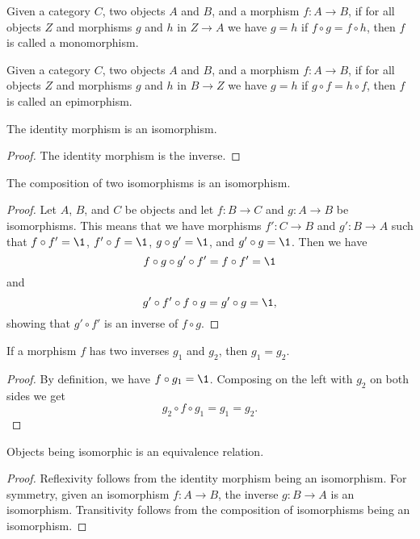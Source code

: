 \documentclass[../../math.tex]{subfiles}
\begin{document}
\begin{definition}
    Given a category $C$, two objects $A$ and $B$, and a morphism $f : A \to B$,
    if for all objects $Z$ and morphisms $g$ and $h$ in $Z \to A$ we have $g =
    h$ if $f \circ g = f \circ h$, then $f$ is called a monomorphism.
\end{definition}

\begin{definition}
    Given a category $C$, two objects $A$ and $B$, and a morphism $f : A \to B$,
    if for all objects $Z$ and morphisms $g$ and $h$ in $B \to Z$ we have $g =
    h$ if $g \circ f = h \circ f$, then $f$ is called an epimorphism.
\end{definition}

\begin{theorem}
    The identity morphism is an isomorphism.
\end{theorem}
\begin{proof}
    The identity morphism is the inverse.
\end{proof}

\begin{theorem}
    The composition of two isomorphisms is an isomorphism.
\end{theorem}
\begin{proof}
    Let $A$, $B$, and $C$ be objects and let $f : B \to C$ and $g : A \to B$ be
    isomorphisms.  This means that we have morphisms $f' : C \to B$ and $g' : B
    \to A$ such that $f \circ f' = \1$, $f' \circ f = \1$, $g \circ g' = \1$,
    and $g' \circ g = \1$.  Then we have
    \[
        f \circ g \circ g' \circ f' = f \circ f' = \1
    \]
    and
    \[
        g' \circ f' \circ f \circ g = g' \circ g = \1,
    \]
    showing that $g' \circ f'$ is an inverse of $f \circ g$.
\end{proof}

\begin{theorem}
    If a morphism $f$ has two inverses $g_1$ and $g_2$, then $g_1 = g_2$.
\end{theorem}
\begin{proof}
    By definition, we have $f \circ g_1 = \1$.  Composing on the left with $g_2$
    on both sides we get
    \[
        g_2 \circ f \circ g_1 = g_1 = g_2.
    \]
\end{proof}

\begin{theorem}
    Objects being isomorphic is an equivalence relation.
\end{theorem}
\begin{proof}
    Reflexivity follows from the identity morphism being an isomorphism.  For
    symmetry, given an isomorphism $f : A \to B$, the inverse $g : B \to A$ is
    an isomorphism.  Transitivity follows from the composition of isomorphisms
    being an isomorphism.
\end{proof}
\end{document}
